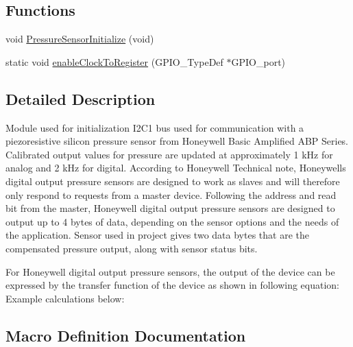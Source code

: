 \subsection*{Functions}
\begin{DoxyCompactItemize}
\item 
void \mbox{\hyperlink{group___pressure_sensor_a_b_p_m_a_n_n005_p_g2_a3_gafcf98649d6a541e08f6a531cdd948e7a_gafcf98649d6a541e08f6a531cdd948e7a}{Pressure\+Sensor\+Initialize}} (void)
\item 
static void \mbox{\hyperlink{group___pressure_sensor_a_b_p_m_a_n_n005_p_g2_a3_ga3c470c357442c6697f971a72790975e8_ga3c470c357442c6697f971a72790975e8}{enable\+Clock\+To\+Register}} (G\+P\+I\+O\+\_\+\+Type\+Def $\ast$G\+P\+I\+O\+\_\+port)
\end{DoxyCompactItemize}


\subsection{Detailed Description}
Module used for initialization I2\+C1 bus used for communication with a piezoresistive silicon pressure sensor from Honeywell Basic Amplified A\+BP Series. Calibrated output values for pressure are updated at approximately 1 k\+Hz for analog and 2 k\+Hz for digital. According to Honeywell Technical note, Honeywell\textquotesingle{}s digital output pressure sensors are designed to work as slaves and will therefore only respond to requests from a master device. Following the address and read bit from the master, Honeywell digital output pressure sensors are designed to output up to 4 bytes of data, depending on the sensor options and the needs of the application. Sensor used in project gives two data bytes that are the compensated pressure output, along with sensor status bits. 

 For Honeywell digital output pressure sensors, the output of the device can be expressed by the transfer function of the device as shown in following equation\+:  Example calculations below\+:  

\subsection{Macro Definition Documentation}
\mbox{\label{group___pressure_sensor_a_b_p_m_a_n_n005_p_g2_a3_gaab67b9610994e1990a3b56590a129775_gaab67b9610994e1990a3b56590a129775}} 
